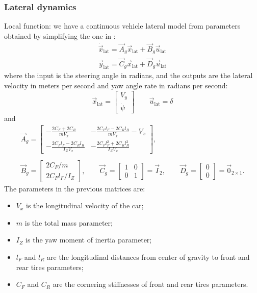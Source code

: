 \subsubsection{Lateral dynamics}
Local function: we have a continuous vehicle lateral model from parameters obtained by simplifying the one in \cite{rathai}: 
\begin{equation}
\label{eqn:lateral_dynamics_simple_model}
\begin{array}{ll}
\dot{\vec{x}}_{\text{lat}} =\vec{A}_g \vec{x}_{\text{lat}}+ \vec{B}_g \vec{u}_{\text{lat}}\\
\vec{y}_{\text{lat}} =\vec{C}_g \vec{x}_{\text{lat}} + \vec{D}_g \vec{u}_{\text{lat}}
\end{array}
\end{equation}
where the input is the steering angle in radians, and the outputs are the lateral velocity in meters per second and yaw angle rate in radians per second:
\begin{equation}
\vec{x}_{\text{lat}} = \begin{bmatrix}
V_y\\\dot{\psi}
\end{bmatrix}
\qquad
\vec{u}_{\text{lat}} = \delta
\end{equation}
and
\begin{equation}
\begin{array}{cc}
\vec{A}_g=
\begin{bmatrix}
\displaystyle -\frac{2C_F+2C_R}{mV_x}&\displaystyle -\frac{2C_Fl_F-2C_Rl_R}{mV_x} - V_x\\
\displaystyle -\frac{2C_Fl_F-2C_Rl_R}{I_ZV_x}&\displaystyle -\frac{2C_Fl_F^2+2C_Rl_R^2}{I_ZV_x}
\end{bmatrix},
\\\\
\vec{B}_g=\begin{bmatrix}
2C_F/m\\2C_Fl_F/I_Z
\end{bmatrix},
\qquad
\vec{C}_g=\begin{bmatrix}
1&0\\0&1
\end{bmatrix}=
\vec{I}_2, 
\qquad
\vec{D}_g=\begin{bmatrix}
0\\0
\end{bmatrix}=
\vec{0}_{2\times1}.
\end{array}
\end{equation}
The parameters in the previous matrices are:
\begin{itemize}
	\item $V_x$ is the longitudinal velocity of the car;	
	\item $m$ is the total mass parameter; 
	\item $I_Z$ is the yaw moment of inertia parameter;
	\item $l_F$ and $l_R$ are the longitudinal distances from center of gravity to front and rear tires parameters;
	\item $C_F$ and $C_R$ are the cornering stiffnesses of front and rear tires parameters.
\end{itemize}
